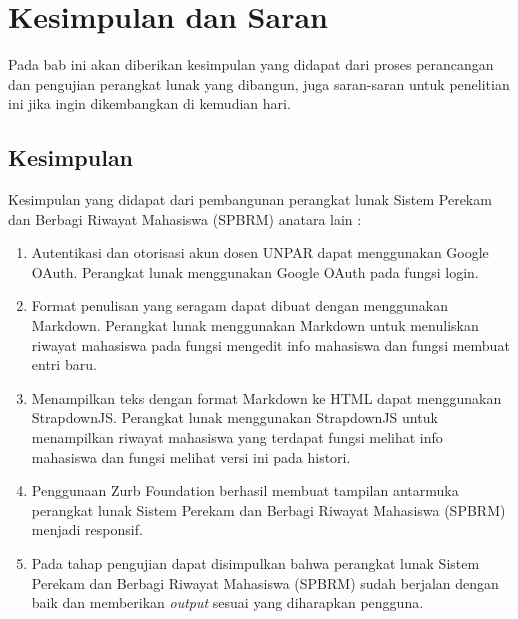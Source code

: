 \chapter{Kesimpulan dan Saran}
\label{chap:kesimpulandansaran}

Pada bab ini akan diberikan kesimpulan yang didapat dari proses perancangan dan
pengujian perangkat lunak yang dibangun, juga saran-saran untuk penelitian ini
jika ingin dikembangkan di kemudian hari.

\section{Kesimpulan}
\label{sec:kesimpulan}
Kesimpulan yang didapat dari pembangunan perangkat lunak Sistem Perekam dan Berbagi Riwayat Mahasiswa (SPBRM) anatara lain :
\begin{enumerate}[(1)]
  \item Autentikasi dan otorisasi akun dosen UNPAR dapat menggunakan Google OAuth. Perangkat lunak menggunakan Google OAuth pada fungsi login. 
  \item Format penulisan yang seragam dapat dibuat dengan menggunakan Markdown. Perangkat lunak menggunakan Markdown untuk menuliskan riwayat mahasiswa pada fungsi mengedit info mahasiswa dan fungsi membuat entri baru.
  \item Menampilkan teks dengan format Markdown ke HTML dapat menggunakan StrapdownJS. Perangkat lunak menggunakan StrapdownJS untuk menampilkan riwayat mahasiswa yang terdapat fungsi melihat info mahasiswa dan fungsi melihat versi ini pada histori.
  \item Penggunaan Zurb Foundation berhasil membuat tampilan antarmuka perangkat
  lunak Sistem Perekam dan Berbagi Riwayat Mahasiswa (SPBRM) menjadi responsif.
  \item Pada tahap pengujian dapat disimpulkan bahwa perangkat lunak Sistem
  Perekam dan Berbagi Riwayat Mahasiswa (SPBRM) sudah berjalan dengan baik dan memberikan
  {\it output} sesuai yang diharapkan pengguna.
\end{enumerate}

